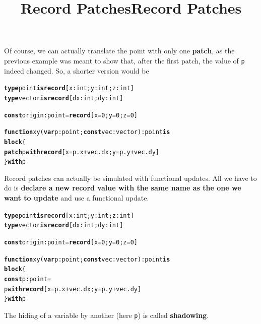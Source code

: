 \documentclass[wide]{slides}
\newcommand{\Kblock}[0]{\textbf{block}\xspace}
\newcommand{\Kconst}[0]{\textbf{const}\xspace}
\newcommand{\Kfunction}[0]{\textbf{function}\xspace}
\newcommand{\Kis}[0]{\textbf{is}\xspace}
\newcommand{\Kpatch}[0]{\textbf{patch}\xspace}
\newcommand{\Krecord}[0]{\textbf{record}\xspace}
\newcommand{\Ktype}[0]{\textbf{type}\xspace}
\newcommand{\Kvar}[0]{\textbf{var}\xspace}
\newcommand{\Kwith}[0]{\textbf{with}\xspace}
\begin{document}
\begin{slide}
  \title{Record Patches}

    Of course, we can actually translate the point with only one
    \textbf{patch}, as the previous example was meant to show that,
    after the first patch, the value of \texttt{p} indeed changed. So,
    a shorter version would be
      \begin{alltt}
\Ktype point \Kis \Krecord [x : int; y : int; z : int]
\Ktype vector \Kis \Krecord [dx : int; dy : int]

\Kconst origin : point = \Krecord [x = 0; y = 0; z = 0]

\Kfunction xy (\Kvar p : point; \Kconst vec : vector) : point \Kis
  \Kblock \{
    \Kpatch p \Kwith \Krecord [x = p.x + vec.dx; y = p.y + vec.dy]
  \} \Kwith p
      \end{alltt}

\end{slide}

\begin{slide}
  \title{Record Patches}

    Record patches can actually be simulated with functional
    updates. All we have to do is \textbf{declare a new record value
      with the same name as the one we want to update} and use a
    functional update.

      \begin{alltt}
\Ktype point \Kis \Krecord [x : int; y : int; z : int]
\Ktype vector \Kis \Krecord [dx : int; dy : int]

\Kconst origin : point = \Krecord [x = 0; y = 0; z = 0]

\Kfunction xy (\Kvar p : point; \Kconst vec : vector) : point \Kis
  \Kblock \{
    \Kconst p : point =
       p \Kwith \Krecord [x = p.x + vec.dx; y = p.y + vec.dy]
  \} \Kwith p
      \end{alltt}


The hiding of a variable by another (here \texttt{p}) is called
\textbf{shadowing}.

\end{slide}
\end{document}
